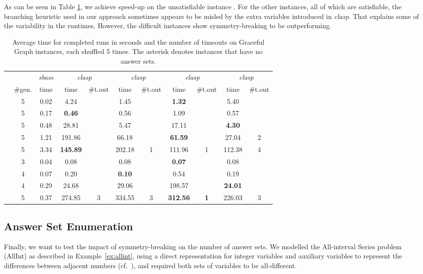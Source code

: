 \documentclass[envcountsame]{llncs}
\newcommand{\systemname}[1]{\emph{#1}}
\begin{document}
As can be seen in Table \ref{tab:graceful}, we achieve speed-up on the unsatisfiable instance . For the other instances, all of which are satisfiable, the branching heuristic used in our approach sometimes appears to be misled by the extra variables introduced in \systemname{clasp}. That explains some of the variability in the runtimes. However, the difficult instances show symmetry-breaking to be outperforming.
\begin{table}
\caption{Average time for completed runs in seconds and the number of timeouts on Graceful Graph instances, each shuffled 5 times. The asterisk denotes instances that have no answer sets.\label{tab:graceful}}
\centering
\begin{tabular}{lcccccccccc}
\hline\noalign{\smallskip}
 & & \systemname{sbass} & \multicolumn{2}{c}{\systemname{clasp}} & \multicolumn{2}{c}{\systemname{clasp}} & \multicolumn{2}{c}{\systemname{clasp}} & \multicolumn{2}{c}{\systemname{clasp}}\\ 
   & \#gen. & time & time & \#t.out & time & \#t.out & time & \#t.out & time & \#t.out\\
\noalign{\smallskip}
\hline
\noalign{\smallskip}
   & 5 & 0.02 & 4.24 & & 1.45 & & \textbf{1.32} & & 5.40 &\\
   & 5 & 0.17 & \textbf{0.46} & & 0.56 & & 1.09 & & 0.57 &\\
   & 5 & 0.48 &28.81 & & 5.47 & &17.11 & & \textbf{4.30} &\\
& 5 & 1.21 &191.86& &66.18 & &\textbf{61.59} & &27.04 &2\\
& 5 & 3.34 & \textbf{145.89}& &202.18&1&111.96 &1&112.38 &4\\
 & 3 & 0.04 & 0.08 & & 0.08 & & \textbf{0.07} & & 0.08 &\\
 & 4 & 0.07 & 0.20 & & \textbf{0.10} & & 0.54 & & 0.19 &\\
 & 4 & 0.29 &24.68 & &29.06 & &198.57& &\textbf{24.01}& \\
 & 5 & 0.37 &274.85&3&334.55&3&\textbf{312.56}&\textbf{1}&226.03&3\\
\hline
\end{tabular}
\end{table}

\subsection{Answer Set Enumeration \label{sec:enum}}
Finally, we want to test the impact of symmetry-breaking on the number of answer sets. We modelled the All-interval Series problem (AllInt) as described in Example~\ref{ex:allint}, using a direct representation for  integer variables and auxiliary variables to represent the differences between adjacent numbers (cf.~\cite{drwa10a}), and required both sets of variables to be all-different.
\end{document}
